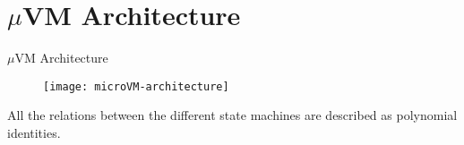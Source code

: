 
\section{$\mu$VM Architecture}

\begin{frame}{$\mu$VM Architecture}
\begin{figure}
\texttt{[image: microVM-architecture]}
\end{figure}
All the relations between the different state machines are described as polynomial identities.
\end{frame}